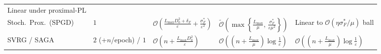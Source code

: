 \documentclass[../../../../master.tex]{subfiles}
\begin{document}
\begin{table}[htbp]
\begin{tabularx}{\textwidth}{@{}>{\raggedright\arraybackslash}p{2.25cm} >{\raggedright\arraybackslash}p{1.85cm} >{\raggedright\arraybackslash}p{3.15cm} >{\raggedright\arraybackslash}p{3.30cm} >{\raggedright\arraybackslash}X@{}}
Linear under proximal-PL \\
Stoch.\ Prox.\ (SPGD) &
$1$ &
$\mathcal{O}\!\left(\frac{L_{\max}D_0^2 + \delta_F}{\varepsilon} + \frac{\sigma_F^*}{\varepsilon^2}\right)$ &
$\tilde{\mathcal{O}}\!\left(\max\!\left\{\frac{L_{\max}}{\mu},\, \frac{\sigma_F^*}{\varepsilon\mu^2}\right\}\right)$ &
Linear to $\mathcal{O}(\eta \sigma_F^*/\mu)$ ball \\
SVRG / SAGA &
$2$ (+$n$/epoch) / $1$ &
$\mathcal{O}\!\left(n + \frac{L_{\max}D_0^2}{\varepsilon}\right)$ &
$\mathcal{O}\!\left(\left(n + \frac{L_{\max}}{\mu}\right)\log\frac{1}{\varepsilon}\right)$ &
$\mathcal{O}\!\left(\left(n + \frac{L_{\max}}{\mu}\right)\log\frac{1}{\varepsilon}\right)$ \\
\bottomrule
\end{tabularx}
\end{table}
\end{document}
